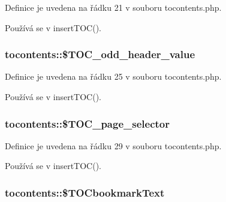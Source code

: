 Definice je uvedena na řádku 21 v souboru tocontents.\-php.



Používá se v insert\-T\-O\-C().

\hypertarget{classtocontents_aacbde625ff75155bffe584b6e58a7dc8}{
\subsubsection[{\$\-T\-O\-C\-\_\-odd\-\_\-header\-\_\-value}]{\setlength{\rightskip}{0pt plus 5cm}tocontents\-::\$\-T\-O\-C\-\_\-odd\-\_\-header\-\_\-value}}\label{classtocontents_aacbde625ff75155bffe584b6e58a7dc8}


Definice je uvedena na řádku 25 v souboru tocontents.\-php.



Používá se v insert\-T\-O\-C().

\hypertarget{classtocontents_a39a75858fd455068f1b8361deeaa9da3}{
\subsubsection[{\$\-T\-O\-C\-\_\-page\-\_\-selector}]{\setlength{\rightskip}{0pt plus 5cm}tocontents\-::\$\-T\-O\-C\-\_\-page\-\_\-selector}}\label{classtocontents_a39a75858fd455068f1b8361deeaa9da3}


Definice je uvedena na řádku 29 v souboru tocontents.\-php.



Používá se v insert\-T\-O\-C().

\hypertarget{classtocontents_a2191c0d9ec2b06d9343ff08267adfeca}{
\subsubsection[{\$\-T\-O\-Cbookmark\-Text}]{\setlength{\rightskip}{0pt plus 5cm}tocontents\-::\$\-T\-O\-Cbookmark\-Text}}\label{classtocontents_a2191c0d9ec2b06d9343ff08267adfeca}


